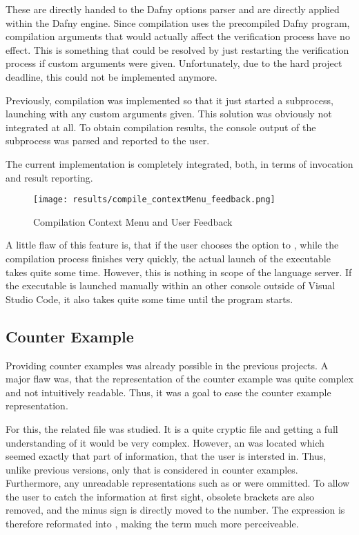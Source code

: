 These are directly handed to the Dafny options parser and are directly applied within the Dafny engine.
Since compilation uses the precompiled Dafny program, compilation arguments that would actually affect the verification process have no effect.
This is something that could be resolved by just restarting the verification process if custom arguments were given.
Unfortunately, due to the hard project deadline, this could not be implemented anymore.

Previously, compilation was implemented so that it just started a subprocess, launching  with any custom arguments given.
This solution was obviously not integrated at all.
To obtain compilation results, the console output of the subprocess was parsed and reported to the user.

The current implementation is completely integrated, both, in terms of invocation and result reporting.

\begin{figure}[h]
    \centering
    \texttt{[image: results/compile\_contextMenu\_feedback.png]}
    \caption{Compilation Context Menu and User Feedback}
    \label{fig:compilation_stuff}
\end{figure}


A little flaw of this feature is, that if the user chooses the option to , while the compilation process finishes very quickly, the actual launch of the executable takes quite some time.
However, this is nothing in scope of the language server.
If the executable is launched manually within an other console outside of Visual Studio Code, it also takes quite some time until the program starts.

\subsection{Counter Example}
Providing counter examples was already possible in the previous projects.
A major flaw was, that the representation of the counter example was quite complex and not intuitively readable.
Thus, it was a goal to ease the counter example representation.

For this, the related  file was studied.
It is a quite cryptic file and getting a full understanding of it would be very complex.
However, an  was located which seemed exactly that part of information, that the user is intersted in.
Thus, unlike previous versions, only that  is considered in counter examples.
Furthermore, any unreadable representations such as  or  were ommitted.
To allow the user to catch the information at first sight, obsolete brackets are also removed, and the minus sign is directly moved to the number.
The expression  is therefore reformated into , making the term much more perceiveable.

